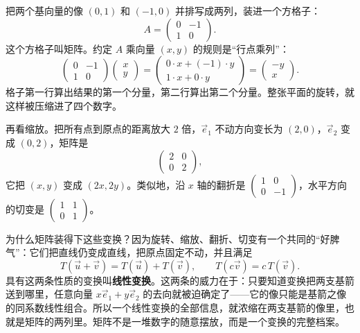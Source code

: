 把两个基向量的像 $(0,1)$ 和 $(-1,0)$ 并排写成两列，装进一个方格子：
\[
A=\begin{pmatrix}0&-1\\1&0\end{pmatrix}.
\]
这个方格子叫矩阵。约定 $A$ 乘向量 $(x,y)$ 的规则是“行点乘列”：
\[
\begin{pmatrix}0&-1\\1&0\end{pmatrix}\begin{pmatrix}x\\y\end{pmatrix}
=\begin{pmatrix}0\cdot x+(-1)\cdot y\\1\cdot x+0\cdot y\end{pmatrix}
=\begin{pmatrix}-y\\x\end{pmatrix}.
\]
格子第一行算出结果的第一个分量，第二行算出第二个分量。整张平面的旋转，就这样被压缩进了四个数字。

再看缩放。把所有点到原点的距离放大 $2$ 倍，$\vec{e}_1$ 不动方向变长为 $(2,0)$，$\vec{e}_2$ 变成 $(0,2)$，矩阵是
\[
\begin{pmatrix}2&0\\0&2\end{pmatrix},
\]
它把 $(x,y)$ 变成 $(2x,2y)$。类似地，沿 $x$ 轴的翻折是 $\begin{pmatrix}1&0\\0&-1\end{pmatrix}$，水平方向的切变是 $\begin{pmatrix}1&1\\0&1\end{pmatrix}$。

为什么矩阵装得下这些变换？因为旋转、缩放、翻折、切变有一个共同的“好脾气”：它们把直线仍变成直线，把原点固定不动，并且满足
\[
T(\vec{u}+\vec{v})=T(\vec{u})+T(\vec{v}),\qquad T(c\vec{v})=c\,T(\vec{v}).
\]
具有这两条性质的变换叫\textbf{线性变换}。这两条的威力在于：只要知道变换把两支基箭送到哪里，任意向量 $x\vec{e}_1+y\vec{e}_2$ 的去向就被迫确定了——它的像只能是基箭之像的同系数线性组合。所以一个线性变换的全部信息，就浓缩在两支基箭的像里，也就是矩阵的两列里。矩阵不是一堆数字的随意摆放，而是一个变换的完整档案。

